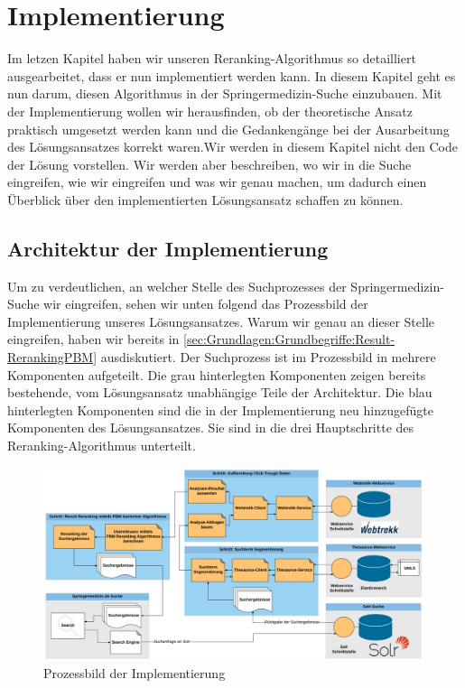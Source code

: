 %
\chapter{Implementierung}
\label{sec:Implementierung}

Im letzen Kapitel haben wir unseren Reranking-Algorithmus so detailliert ausgearbeitet, dass er nun implementiert werden kann. In diesem Kapitel geht es nun darum, diesen Algorithmus in der Springermedizin-Suche einzubauen. Mit der Implementierung wollen wir herausfinden, ob der theoretische Ansatz praktisch umgesetzt werden kann und die Gedankengänge bei der Ausarbeitung des Lösungsansatzes korrekt waren.Wir werden in diesem Kapitel nicht den Code der Lösung vorstellen. Wir werden aber beschreiben, wo wir in die Suche eingreifen, wie wir eingreifen und was wir genau machen, um dadurch einen Überblick über den implementierten Lösungsansatz schaffen zu können.

\section{Architektur der Implementierung}
\label{sec:Implementierung:Architektur}

Um zu verdeutlichen, an welcher Stelle des Suchprozesses der Springermedizin-Suche wir eingreifen, sehen wir unten folgend das Prozessbild der Implementierung unseres Lösungsansatzes. Warum wir genau an dieser Stelle eingreifen, haben wir bereits in \ref{sec:Grundlagen:Grundbegriffe:Result-RerankingPBM} ausdiskutiert. Der Suchprozess ist im Prozessbild in mehrere Komponenten aufgeteilt. Die grau hinterlegten Komponenten zeigen bereits bestehende, vom Lösungsansatz unabhängige Teile der Architektur. Die blau hinterlegten Komponenten sind die in der Implementierung neu hinzugefügte Komponenten des Lösungsansatzes. Sie sind in die drei Hauptschritte des Reranking-Algorithmus unterteilt.

\begin{figure}[H]
\centering
\vspace{-1em}
\caption[Prozessbild der Implementierung]{Prozessbild der Implementierung}
\label{fig:ProzessbildImplementierung}
\includegraphics[width=\linewidth]{gfx/ImplementierungProzessbild}
\vspace{-3em}
\end{figure}

